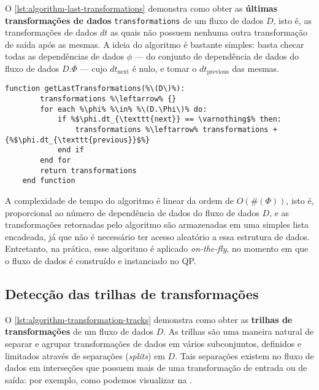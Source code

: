 O \autoref{lst:algorithm-last-transformations} demonstra como obter as \textbf{últimas transformações de dados} \texttt{transformations} de um fluxo de dados \( D \), isto é, as transformações de dados \(dt\) as quais não possuem nenhuma outra transformação de saída após as mesmas. A ideia do algoritmo é bastante simples: basta checar todas as dependências de dados \( \phi \) --- do conjunto de dependência de dados do fluxo de dados \( D.\Phi \) --- cujo \( dt_{\textrm{next}} \) é nulo, e tomar o \( dt_{\textrm{previous}} \) das mesmas.

\begin{minipage}[c]{\linewidth}
\begin{lstlisting}[language=pseudocode,label={lst:algorithm-last-transformations},caption={[Detecção das últimas transformações de dados]Detecção das útimas transformações de dados em uma especificação de fluxo de dados.}]
    function getLastTransformations(%\(D\)%):
        transformations %\leftarrow% {}
        for each %\phi% %\in% %\(D.\Phi\)% do:
            if %$\phi.dt_{\texttt{next}} == \varnothing$% then:
                transformations %\leftarrow% transformations + {%$\phi.dt_{\texttt{previous}}$%}
            end if
        end for
        return transformations
    end function
\end{lstlisting}
\end{minipage}

A complexidade de tempo do algoritmo é linear da ordem de \( O(\#(\Phi)) \), isto é, proporcional ao número de dependência de dados do fluxo de dados \( D \), e as transformações retornadas pelo algoritmo são armazenadas em uma simples lista encadeada, já que não é necessário ter acesso aleatório a essa estrutura de dados. Entretanto, na prática, esse algoritmo é aplicado \textit{on-the-fly}, no momento em que o fluxo de dados é construído e instanciado no QP.

\subsection{Detecção das trilhas de transformações}

O \autoref{lst:algorithm-transformation-tracks} demonstra como obter as \textbf{trilhas de transformações} de um fluxo de dados \( D \). As trilhas são uma maneira natural de separar e agrupar transformações de dados em vários subconjuntos, definidos e limitados através de separações (\textit{splits}) em \( D \). Tais separações existem no fluxo de dados em interseções que possuem mais de uma transformação de entrada ou de saída: por exemplo, como podemos visualizar na .


